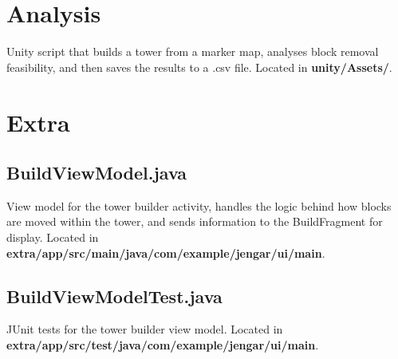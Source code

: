 \begin{landscape}
\begin{multicols}{2}
\section{Analysis}\label{codesec:analysis}
Unity script that builds a tower from a marker map, analyses block removal feasibility, and then saves the results to a .csv file. Located in \textbf{unity/Assets/}.
\texttt{}

\section{Extra}\label{codesec:extra}

\subsection{BuildViewModel.java}
View model for the tower builder activity, handles the logic behind how blocks are moved within the tower, and sends information to the BuildFragment for display. Located in \textbf{extra/app/src/main/java/com/example/jengar/ui/main}.
\texttt{}

\subsection{BuildViewModelTest.java}\label{code:unittests}
JUnit tests for the tower builder view model. Located in \textbf{extra/app/src/test/java/com/example/jengar/ui/main}.
\texttt{}

\end{multicols}
\end{landscape}